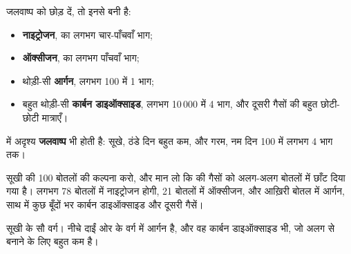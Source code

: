 \begin{proposition}[वायु किससे बनी है]\label{prop:g4:air-a-mixture-of-gases:composition}
जलवाष्प को छोड़ दें, तो  इनसे बनी है:
\begin{itemize}
  \item \textbf{नाइट्रोजन},  का लगभग चार-पाँचवाँ भाग;
  \item \textbf{ऑक्सीजन},  का लगभग पाँचवाँ भाग;
  \item थोड़ी-सी \textbf{आर्गन}, लगभग 100 में 1 भाग;
  \item बहुत थोड़ी-सी \textbf{कार्बन डाइऑक्साइड}, लगभग 10\,000 में 4 भाग,
        और दूसरी गैसों की बहुत छोटी-छोटी मात्राएँ।
\end{itemize}
 में अदृश्य \textbf{जलवाष्प} भी होती है: सूखे, ठंडे दिन बहुत कम,
और गरम, नम दिन 100 में लगभग 4 भाग तक।
\end{proposition}

\begin{example}[वायु की सौ बोतलें]\label{ex:g4:air-a-mixture-of-gases:hundred}
सूखी  की 100 बोतलों की कल्पना करो, और मान लो कि  की गैसों को
अलग-अलग बोतलों में छाँट दिया गया है। लगभग 78 बोतलों में नाइट्रोजन होगी,
21 बोतलों में ऑक्सीजन, और आख़िरी बोतल में आर्गन, साथ में कुछ बूँदों भर
कार्बन डाइऑक्साइड और दूसरी गैसें।
\end{example}

\begin{omfigure}

{\small सूखी  के सौ वर्ग। नीचे दाईं ओर के वर्ग में आर्गन है, और वह
कार्बन डाइऑक्साइड भी, जो अलग से बनाने के लिए बहुत कम है।}
\end{omfigure}

